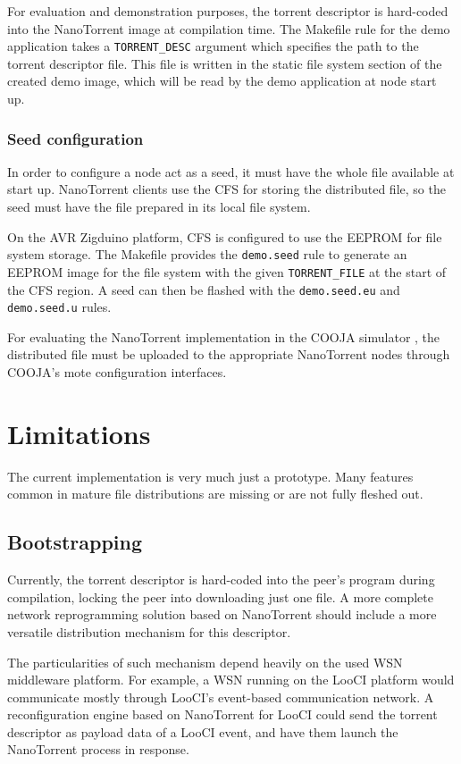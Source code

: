 For evaluation and demonstration purposes, the torrent descriptor is hard-coded into the NanoTorrent image at compilation time. The Makefile rule for the demo application takes a \texttt{TORRENT\_DESC} argument which specifies the path to the torrent descriptor file. This file is written in the static file system section of the created demo image, which will be read by the demo application at node start up.

\subsubsection{Seed configuration}
In order to configure a node act as a seed, it must have the whole file available at start up. NanoTorrent clients use the \acrfull{CFS} for storing the distributed file, so the seed must have the file prepared in its local file system.

On the AVR Zigduino platform, \acrfull{CFS} is configured to use the \gls{EEPROM} for file system storage. The Makefile provides the \texttt{demo.seed} rule to generate an \gls{EEPROM} image for the file system with the given \texttt{TORRENT\_FILE} at the start of the \gls{CFS} region. A seed can then be flashed with the \texttt{demo.seed.eu} and \texttt{demo.seed.u} rules.

For evaluating the NanoTorrent implementation in the COOJA simulator \cite{cooja}, the distributed file must be uploaded to the appropriate NanoTorrent nodes through COOJA's mote configuration interfaces.

\section{Limitations}
\label{sec:impl:limitations}
The current implementation is very much just a prototype. Many features common in mature file distributions are missing or are not fully fleshed out.

\subsection{Bootstrapping}
Currently, the torrent descriptor is hard-coded into the peer's program during compilation, locking the peer into downloading just one file. A more complete network reprogramming solution based on NanoTorrent should include a more versatile distribution mechanism for this descriptor.

The particularities of such mechanism depend heavily on the used \gls{WSN} middleware platform. For example, a \gls{WSN} running on the LooCI \cite{looci} platform would communicate mostly through LooCI's event-based communication network. A reconfiguration engine based on NanoTorrent for LooCI could send the torrent descriptor as payload data of a LooCI event, and have them launch the NanoTorrent process in response.

